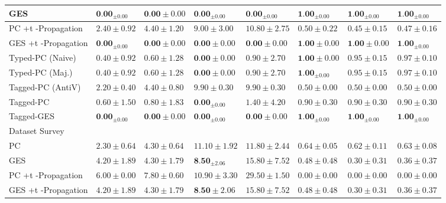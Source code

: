 \documentclass[10pt]{article}
\begin{document}
\begin{center}
\begin{tabular}{|l|l|l|l|l|l|l|l|}
\hline
GES & $\mathbf{0 . 0 0}_{ \pm 0.00}$ & $\mathbf{0 . 0 0} \pm 0.00$ & $\mathbf{0 . 0 0}_{ \pm 0.00}$ & $\mathbf{0 . 0 0}_{ \pm 0.00}$ & $\mathbf{1 . 0 0}_{ \pm 0.00}$ & $\mathbf{1 . 0 0}_{ \pm 0.00}$ & $\mathbf{1 . 0 0}_{ \pm 0.00}$ \\
\hline
PC +t -Propagation & $2.40 \pm 0.92$ & $4.40 \pm 1.20$ & $9.00 \pm 3.00$ & $10.80 \pm 2.75$ & $0.50 \pm 0.22$ & $0.45 \pm 0.15$ & $0.47 \pm 0.16$ \\
\hline
GES +t -Propagation & $\mathbf{0 . 0 0}_{ \pm 0.00}$ & $\mathbf{0 . 0 0} \pm 0.00$ & $\mathbf{0 . 0 0} \pm 0.00$ & $\mathbf{0 . 0 0} \pm 0.00$ & $\mathbf{1 . 0 0} \pm 0.00$ & $\mathbf{1 . 0 0} \pm 0.00$ & $\mathbf{1 . 0 0}_{ \pm 0.00}$ \\
\hline
Typed-PC (Naive) & $0.40 \pm 0.92$ & $0.60 \pm 1.28$ & $\mathbf{0 . 0 0} \pm 0.00$ & $0.90 \pm 2.70$ & $\mathbf{1 . 0 0} \pm 0.00$ & $0.95 \pm 0.15$ & $0.97 \pm 0.10$ \\
\hline
Typed-PC (Maj.) & $0.40 \pm 0.92$ & $0.60 \pm 1.28$ & $\mathbf{0 . 0 0} \pm 0.00$ & $0.90 \pm 2.70$ & $\mathbf{1 . 0 0}_{ \pm 0.00}$ & $0.95 \pm 0.15$ & $0.97 \pm 0.10$ \\
\hline
Tagged-PC (AntiV) & $2.20 \pm 0.40$ & $4.40 \pm 0.80$ & $9.90 \pm 0.30$ & $9.90 \pm 0.30$ & $0.50 \pm 0.00$ & $0.50 \pm 0.00$ & $0.50 \pm 0.00$ \\
\hline
Tagged-PC & $0.60 \pm 1.50$ & $0.80 \pm 1.83$ & $\mathbf{0 . 0 0}_{ \pm 0.00}$ & $1.40 \pm 4.20$ & $0.90 \pm 0.30$ & $0.90 \pm 0.30$ & $0.90 \pm 0.30$ \\
\hline
Tagged-GES & $\mathbf{0 . 0 0}_{ \pm 0.00}$ & $\mathbf{0 . 0 0} \pm 0.00$ & $\mathbf{0 . 0 0}_{ \pm 0.00}$ & $\mathbf{0 . 0 0} \pm 0.00$ & $\mathbf{1 . 0 0}_{ \pm 0.00}$ & $\mathbf{1 . 0 0}_{ \pm 0.00}$ & $\mathbf{1 . 0 0}_{ \pm 0.00}$ \\
\hline
Dataset Survey & \multicolumn{7}{|c|}{} \\
\hline
PC & $2.30 \pm 0.64$ & $4.30 \pm 0.64$ & $11.10 \pm 1.92$ & $11.80 \pm 2.44$ & $0.64 \pm 0.05$ & $0.62 \pm 0.11$ & $0.63 \pm 0.08$ \\
\hline
GES & $4.20 \pm 1.89$ & $4.30 \pm 1.79$ & $\mathbf{8 . 5 0}_{ \pm 2.06}$ & $15.80 \pm 7.52$ & $0.48 \pm 0.48$ & $0.30 \pm 0.31$ & $0.36 \pm 0.37$ \\
\hline
PC +t -Propagation & $6.00 \pm 0.00$ & $7.80 \pm 0.60$ & $10.90 \pm 3.30$ & $29.50 \pm 1.50$ & $0.00 \pm 0.00$ & $0.00 \pm 0.00$ & $0.00 \pm 0.00$ \\
\hline
GES +t -Propagation & $4.20 \pm 1.89$ & $4.30 \pm 1.79$ & $\mathbf{8 . 5 0} \pm 2.06$ & $15.80 \pm 7.52$ & $0.48 \pm 0.48$ & $0.30 \pm 0.31$ & $0.36 \pm 0.37$ \\

\end{tabular}
\end{center}
\end{document}
